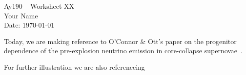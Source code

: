 \documentclass[11pt,letterpaper]{article}
\begin{document}
\begin{center}
\Large
Ay190 -- Worksheet XX\\
Your Name\\
Date: \today
\end{center}

Today, we are making reference to O'Connor \& Ott's paper on the
progenitor dependence of the pre-explosion neutrino emission in
core-collapse supernovae~\cite{oconnor:13}.

For further illustration we are also referenceing~\cite{Moesta:14}




\end{document}
